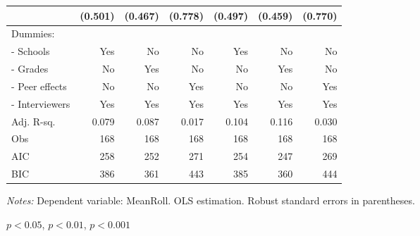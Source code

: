 \begin{table}[htbp]
\begin{adjustbox}{width=1\textwidth}
\begin{threeparttable}
\begin{tabular}{l*{6}{D{.}{.}{-1}}}
                    &             (0.501)   &             (0.467)   &             (0.778)   &             (0.497)   &             (0.459)   &             (0.770)   \\ \midrule
Dummies: &&&&& \\                    
- Schools             &                 Yes   &                  No   &                  No   &                 Yes   &                  No   &                  No   \\
- Grades              &                  No   &                 Yes   &                  No   &                  No   &                 Yes   &                  No   \\
- Peer effects        &                  No   &                  No   &                 Yes   &                  No   &                  No   &                 Yes   \\
- Interviewers        &                 Yes   &                 Yes   &                 Yes   &                 Yes   &                 Yes   &                 Yes   \\
\midrule
Adj. R-sq.          &               0.079   &               0.087   &               0.017   &               0.104   &               0.116   &               0.030   \\
Obs                 &                 168   &                 168   &                 168   &                 168   &                 168   &                 168   \\
AIC                 &                 258   &                 252   &                 271   &                 254   &                 247   &                 269   \\
BIC                 &                 386   &                 361   &                 443   &                 385   &                 360   &                 444   \\
\bottomrule
\end{tabular}
\begin{tablenotes}
\footnotesize
\item \textit{Notes:} Dependent variable: MeanRoll. OLS estimation. Robust standard errors in parentheses. \\
\item \sym{*} \(p<0.05\), \sym{**} \(p<0.01\), \sym{***} \(p<0.001\)
\end{tablenotes}
\end{threeparttable}
\end{adjustbox}
\label{tab:cheat_tot}
\end{table}

